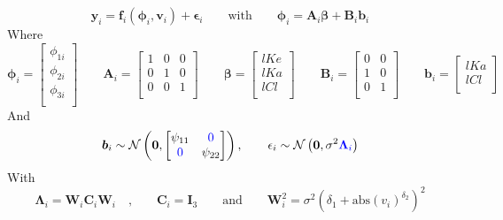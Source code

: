 \documentclass[a4paper,12pt]{article}
\begin{document}
	\subsection{}
	\begin{equation*}
	\boldsymbol{y}_i = \boldsymbol{f}_i\left(\boldsymbol{\phi}_i,\boldsymbol{v}_i\right) + \boldsymbol{\epsilon}_i \qquad \text{with} \qquad \boldsymbol{\phi}_i = \boldsymbol{A}_i \boldsymbol{\beta} + \boldsymbol{B}_i \boldsymbol{b}_i
	\end{equation*}
	Where
	\begin{equation*}
	\boldsymbol{\phi}_i = \begin{bmatrix}
	\phi_{1i} \\
	\phi_{2i} \\
	\phi_{3i} \\
	\end{bmatrix}
	\qquad
	\boldsymbol{A}_i = \begin{bmatrix}
	1 & 0 & 0 \\
	0 & 1 & 0 \\
	0 & 0 & 1 \\
	\end{bmatrix}
	\qquad
	\boldsymbol{\beta} = \begin{bmatrix}
	lKe \\
	lKa \\
	lCl \\
	\end{bmatrix}
	\qquad
	\boldsymbol{B}_i = \begin{bmatrix}
	0 & 0 \\
	1 & 0 \\
	0 & 1 \\
	\end{bmatrix}
	\qquad
	\boldsymbol{b}_i = \begin{bmatrix}
	lKa \\
	lCl \\
	\end{bmatrix}
	\end{equation*}
	And
	\begin{equation*}
	\boldsymbol{b}_i \sim \mathcal{N}\left(\boldsymbol{0}, \begin{bmatrix}
	\psi_{11} & \textcolor{blue}{0} \\
	\textcolor{blue}{0} & \psi_{22} \\
	\end{bmatrix}\right),
	\qquad
	\epsilon_{i} \sim \mathcal{N}\left(\boldsymbol{0}, \sigma^2 \textcolor{blue}{\boldsymbol{\Lambda}_i}\right)
	\end{equation*}
	With
	\begin{equation*}
	\boldsymbol{\Lambda}_i = \boldsymbol{W}_i \boldsymbol{C}_i \boldsymbol{W}_i\quad\text{,} \qquad\boldsymbol{C}_i = \boldsymbol{I}_3 \qquad \text{and} \qquad \boldsymbol{W}_i^2 = \sigma^2 \left(\delta_1 + \text{abs}(v_i)^{\delta_2}\right)^2
	\end{equation*}
	
\end{document}
